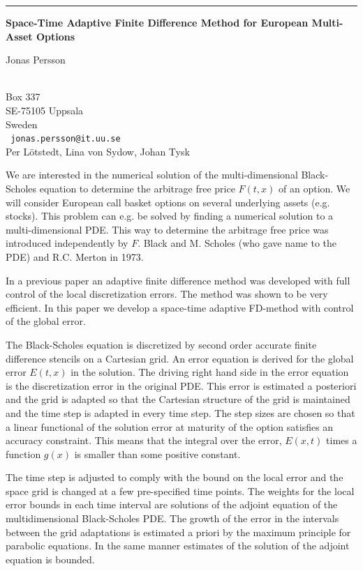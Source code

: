 \documentclass[twosided]{report}
\begin{document}
\begin{center} \rule{6in}{1pt} \end{center}
\newpage	%


\begin{center}
{\large			\label{persson}
{\bf Space-Time Adaptive Finite Difference Method
	for European Multi-Asset Options }

Jonas Persson} \\
Box 337 \\
SE-75105 Uppsala \\
Sweden
\\ {\tt
jonas.persson@it.uu.se
}
\\
Per L\"{o}tstedt,
Lina von Sydow,
Johan Tysk


\end{center}

We are interested in the numerical solution of the multi-dimensional
Black-Scholes equation to determine the arbitrage free price
$F(t,x)$ of
an option. We will consider European call basket options on several
underlying assets (e.g. stocks). This problem can e.g. be solved by
finding a numerical solution to a multi-dimensional PDE. This way to
determine the arbitrage free price was introduced independently by $F$.
Black and M. Scholes (who gave name to the PDE) and R.C. Merton in
1973.

In a previous paper an adaptive finite difference method was developed
with full control of the local discretization errors. The method was
shown to be very efficient. In this paper we develop a space-time
adaptive FD-method with control of the global error.

The Black-Scholes equation is discretized by second order accurate
finite difference stencils on a Cartesian grid. An error equation is
derived for the global error $E(t,x)$ in the solution. The driving right
hand side in the error equation is the discretization error in the
original PDE. This error is estimated a posteriori and the grid is
adapted so that the Cartesian structure of the grid is maintained and
the time step is adapted in every time step. The step sizes are chosen
so that a linear functional of the solution error at maturity of the
option satisfies an accuracy constraint. This means that the integral
over the error, $E(x,t)$ times a function $g(x)$ is smaller than some
positive constant.

The time step is adjusted to comply with the bound on the local error
and the space grid is changed at a few pre-specified time points. The
weights for the local error bounds in each time interval are solutions
of the adjoint equation of the multidimensional Black-Scholes PDE. The
growth of the error in the intervals between the grid adaptations is
estimated a priori by the maximum principle for parabolic equations. In
the same manner estimates of the solution of the adjoint equation is
bounded.
\end{document}
